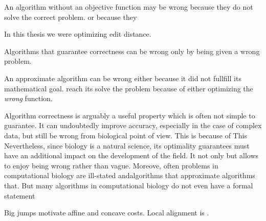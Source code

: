 An algorithm without an objective function may be wrong because they do not
solve the correct problem. or because they 

In this thesis we were optimizing edit distance. 

Algorithms that guarantee correctness can be wrong only by being given a wrong problem.

An approximate algorithm can be wrong either because it did not fullfill its
mathematical goal. reach its solve the problem because of either optimizing the \emph{wrong}
function.

Algorithm correctness is arguably a useful property which is often not simple to
guarantee. It can undoubtedly improve accuracy, especially in the case of
complex data, but still be wrong from biological point of view. This is because
of  This Nevertheless, since biology is a natural science, its  optimality
guarantees must have an additional impact on the development of the field. It
not only but allows to enjoy being wrong rather than vague. Moreove, often
problems in computational biology are ill-stated andalgorithms that approximate
algorithms that. But many algorithms in computational biology do not even have a
formal statement 

Big jumps motivate affine and concave costs. Local alignment is   \cite{arslan2001new}.